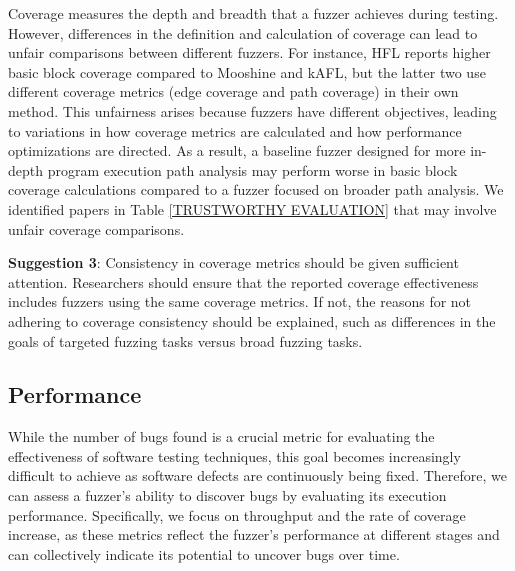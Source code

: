 Coverage measures the depth and breadth that a fuzzer achieves during testing. However, differences in the definition and calculation of coverage can lead to unfair comparisons between different fuzzers. For instance, HFL reports higher basic block coverage compared to Mooshine and kAFL, but the latter two use different coverage metrics (edge coverage and path coverage) in their own method. This unfairness arises because fuzzers have different objectives, leading to variations in how coverage metrics are calculated and how performance optimizations are directed. As a result, a baseline fuzzer designed for more in-depth program execution path analysis may perform worse in basic block coverage calculations compared to a fuzzer focused on broader path analysis. We identified  papers in Table \ref{TRUSTWORTHY EVALUATION} that may involve unfair coverage comparisons.

\begin{tcolorbox}[colback=gray!10!white, colframe=black,left=-0cm, right=-0cm, top=-0cm, bottom=-0cm]
\textbf{Suggestion 3}: Consistency in coverage metrics should be given sufficient attention. Researchers should ensure that the reported coverage effectiveness includes fuzzers using the same coverage metrics. If not, the reasons for not adhering to coverage consistency should be explained, such as differences in the goals of targeted fuzzing tasks versus broad fuzzing tasks.
\end{tcolorbox}

\subsection{Performance}
While the number of bugs found is a crucial metric for evaluating the effectiveness of software testing techniques, this goal becomes increasingly difficult to achieve as software defects are continuously being fixed. Therefore, we can assess a fuzzer's ability to discover bugs by evaluating its execution performance. Specifically, we focus on throughput and the rate of coverage increase, as these metrics reflect the fuzzer's performance at different stages and can collectively indicate its potential to uncover bugs over time.

